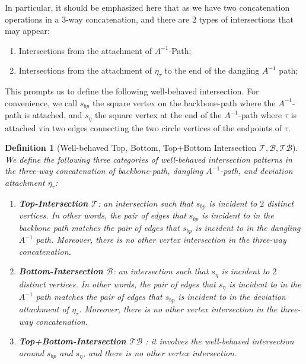 \documentclass[12pt]{article}
\newtheorem{definition}[theorem]{Definition}
\begin{document}
In particular, it should be emphasized here that as we have two concatenation operations in a $3$-way concatenation, and there are $2$ types of intersections that may appear:
\begin{enumerate}
	\item Intersections from the attachment of $A^{-1}$-Path;
	\item Intersections from the attachment of $\eta_\tau$ to the end of the dangling $A^{-1}$ path;
\end{enumerate}

This prompts us to define the following well-behaved intersection. For convenience, we call $s_{bp}$ the square vertex on the backbone-path where the $A^{-1}$-path is attached, and $s_{\eta}$ the square vertex at the end of the $A^{-1}$-path where $\tau$ is attached via two edges connecting the two circle vertices of the endpoints of $\tau$.

\begin{definition}[Well-behaved Top, Bottom, Top+Bottom Intersection $\mathcal{T}, \mathcal{B}, \mathcal{TB}$] \label{def:well-behaved-intersection-vertical}
We define the following three categories of well-behaved intersection patterns in the three-way concatenation of backbone-path, dangling $A^{-1}$-path, and deviation attachment $\eta_\tau$:

\begin{enumerate}
	\item \textbf{Top-Intersection $\mathcal{T}$}: an intersection such that $s_{bp}$ is incident to $2$ distinct vertices. In other words, the pair of edges that $s_{bp}$ is incident to in the backbone path matches the pair of edges that $s_{bp}$ is incident to in the dangling $A^{-1}$ path. Moreover, there is no other vertex intersection in the three-way concatenation.
	\item \textbf{Bottom-Intersection $\mathcal{B}$}: an intersection such that $s_{\eta}$ is incident to $2$ distinct vertices. In other words, the pair of edges that $s_{\eta}$ is incident to in the $A^{-1}$ path matches the pair of edges that $s_{bp}$ is incident to in the deviation attachment of $\eta_\tau$. Moreover, there is no other vertex intersection in the three-way concatenation.
	\item \textbf{Top+Bottom-Intersection $\mathcal{TB}$ }: it involves the well-behaved intersection around $s_{bp}$ and $s_{\eta}$, and there is no other vertex intersection.
\end{enumerate}
\end{definition}
\end{document}
